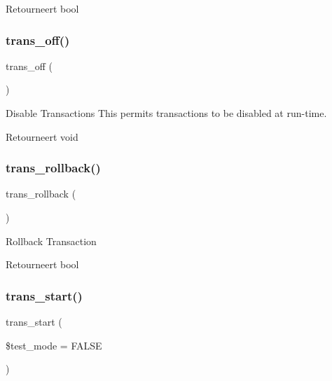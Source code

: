 \begin{DoxyReturn}{Retourneert}
bool 
\end{DoxyReturn}
\mbox{\label{class_c_i___d_b__driver_ae9080ca6b0a9a258f5e87750b266e337}} 
\subsubsection{\texorpdfstring{trans\_off()}{trans\_off()}}
{\footnotesize\ttfamily trans\+\_\+off (\begin{DoxyParamCaption}{ }\end{DoxyParamCaption})}

Disable Transactions This permits transactions to be disabled at run-\/time.

\begin{DoxyReturn}{Retourneert}
void 
\end{DoxyReturn}
\mbox{\label{class_c_i___d_b__driver_a53f76d4dfcd6ac04fb653982442aeef8}} 
\subsubsection{\texorpdfstring{trans\_rollback()}{trans\_rollback()}}
{\footnotesize\ttfamily trans\+\_\+rollback (\begin{DoxyParamCaption}{ }\end{DoxyParamCaption})}

Rollback Transaction

\begin{DoxyReturn}{Retourneert}
bool 
\end{DoxyReturn}
\mbox{\label{class_c_i___d_b__driver_ab082d21c9a77398c6d6705d9e978fb20}} 
\subsubsection{\texorpdfstring{trans\_start()}{trans\_start()}}
{\footnotesize\ttfamily trans\+\_\+start (\begin{DoxyParamCaption}\item[{}]{\$test\+\_\+mode = {\ttfamily FALSE} }\end{DoxyParamCaption})}

